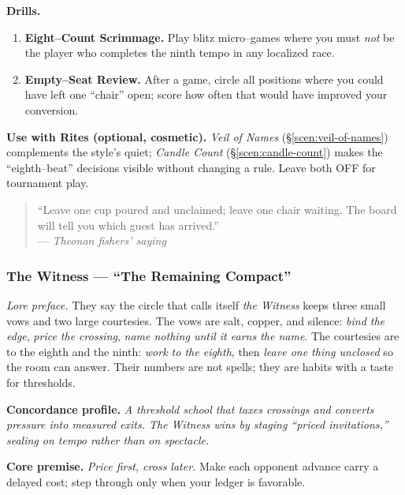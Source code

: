\documentclass[11pt]{article}
\begin{document}
\begin{itemize}
\medskip
\noindent\textbf{Drills.}
\begin{enumerate}\setlength\itemsep{0.25em}
  \item \textbf{Eight–Count Scrimmage.} Play blitz micro–games where you must \emph{not} be the player who completes the ninth tempo in any localized race.
  \item \textbf{Empty–Seat Review.} After a game, circle all positions where you could have left one “chair” open; score how often that would have improved your conversion.
\end{enumerate}

\medskip
\noindent\textbf{Use with Rites (optional, cosmetic).} \emph{Veil of Names} (\S\ref{scen:veil-of-names}) complements the style’s quiet; \emph{Candle Count} (\S\ref{scen:candle-count}) makes the “eighth–beat” decisions visible without changing a rule. Leave both \textsc{OFF} for tournament play.

\medskip
\begin{quote}\small
“Leave one cup poured and unclaimed; leave one chair waiting. The board will tell you which guest has arrived.”\\
\hfill — \textit{Theonan fishers’ saying}
\end{quote}

\subsubsection{The Witness — “The Remaining Compact”}
\label{school:witness}
{}

\noindent\textit{Lore preface.} They say the circle that calls itself \emph{the Witness} keeps three small vows and two large courtesies. The vows are salt, copper, and silence: \emph{bind the edge}, \emph{price the crossing}, \emph{name nothing until it earns the name}. The courtesies are to the eighth and the ninth: \emph{work to the eighth}, then \emph{leave one thing unclosed} so the room can answer. Their numbers are not spells; they are habits with a taste for thresholds.

\medskip
\noindent\textbf{Concordance profile.} \emph{A threshold school that taxes crossings and converts pressure into measured exits. The Witness wins by staging “priced invitations,” sealing on tempo rather than on spectacle.}

\medskip
\noindent\textbf{Core premise.} \textit{Price first, cross later.} Make each opponent advance carry a delayed cost; step through only when your ledger is favorable.


\end{itemize}
\end{document}
